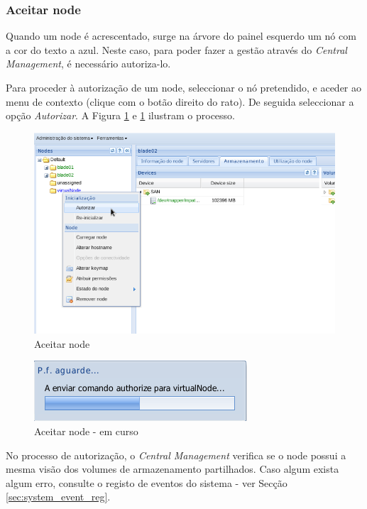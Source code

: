 {\subsubsection{Aceitar node}
Quando um node é acrescentado, surge na árvore do painel esquerdo um nó com a cor do texto a azul. Neste caso, para poder fazer a gestão através do \textit{Central Management}, é necessário autoriza-lo.

Para proceder à autorização de um node, seleccionar o nó pretendido, e aceder ao menu de contexto (clique com o botão direito do rato). De seguida seleccionar a opção \textit{Autorizar}. A Figura \ref{fig:cluster-auth} e \ref{fig:cluster-auth} ilustram o processo.

\begin{figure}[H]
        \begin{center}
        \includegraphics[scale=0.6]{screenshots/cluster-auth.png}
        \caption{Aceitar node}
        \label{fig:cluster-auth}
        \end{center}
\end{figure}

\begin{figure}[H]
        \begin{center}
        \includegraphics[scale=0.6]{screenshots/cluster-auth1.png}
        \caption{Aceitar node - em curso}
        \label{fig:cluster-auth1}
        \end{center}
\end{figure}

No processo de autorização, o \textit{Central Management} verifica se o node possui a mesma visão dos volumes de armazenamento partilhados. Caso algum exista algum erro, consulte o registo de eventos do sistema - ver Secção \ref{sec:system_event_reg}.
} %
 
